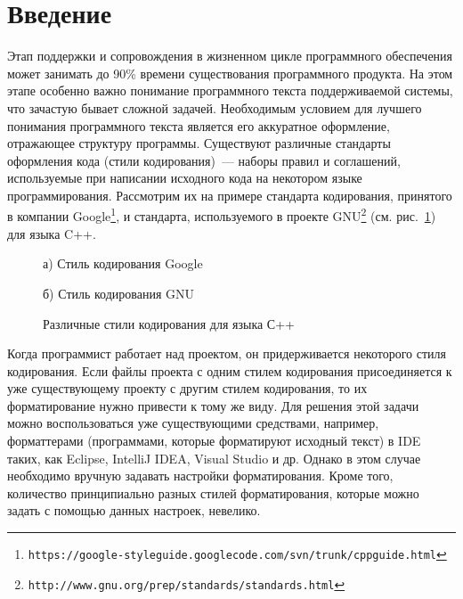 \section*{Введение}

Этап поддержки и сопровождения в жизненном цикле программного обеспечения может занимать до 90\% времени существования программного продукта. На этом этапе особенно важно понимание программного текста поддерживаемой системы, что зачастую бывает сложной задачей. Необходимым условием для лучшего понимания программного текста является его аккуратное оформление, отражающее структуру%
программы. Существуют различные стандарты оформления кода (стили кодирования)~--- наборы правил и соглашений, используемые при написании исходного кода на некотором языке программирования.
Рассмотрим их на примере стандарта кодирования, принятого в компании Google\footnote{\texttt{https://google-styleguide.googlecode.com/svn/trunk/cppguide.html}}, и стандарта, используемого в проекте GNU\footnote{\texttt{http://www.gnu.org/prep/standards/standards.html}} (см. рис.~\ref{codingstandards}) для языка C++.


\begin{figure}[ht]
\noindent\begin{minipage}{.5\textwidth}
    
\caption*{а) Стиль кодирования Google}    
\end{minipage}\hfill
\begin{minipage}{.5\textwidth}
    
\caption*{б) Стиль кодирования GNU}    
\end{minipage}
\caption{Различные стили кодирования для языка С++}    
\label{codingstandards}
\end{figure}

Когда программист работает над проектом, он придерживается некоторого стиля кодирования. 
Если файлы проекта с одним стилем кодирования присоединяется к уже существующему проекту с другим стилем кодирования, то их форматирование нужно привести к тому же виду. 
Для решения этой задачи можно воспользоваться уже существующими средствами, например, форматтерами (программами, которые форматируют исходный текст) в IDE таких, как Eclipse, IntelliJ IDEA, Visual Studio и др. 
Однако в этом случае необходимо вручную задавать настройки форматирования.
Кроме того, количество принципиально разных стилей форматирования, которые можно задать с помощью данных настроек, невелико.


